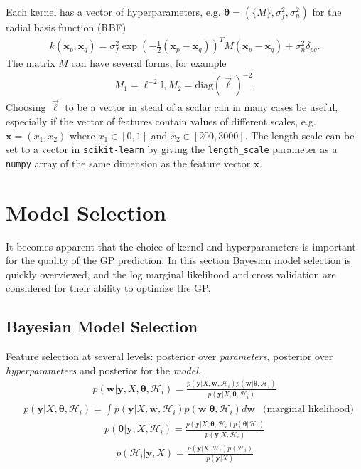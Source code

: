 \documentclass[twoside,english]{uiofysmaster}
\begin{document}
Each kernel has a vector of hyperparameters, e.g. $\boldsymbol{\theta} = (\{M\}, \sigma^2_f, \sigma_n^2)$ for the radial basis function (RBF)
\begin{align}
k(\textbf{x}_p, \textbf{x}_q) = \sigma_f^2 \exp (- \frac{1}{2} (\textbf{x}_p - \textbf{x}_q))^T M (\textbf{x}_p - \textbf{x}_q) + \sigma_n^2 \delta_{pq}.
\end{align}
The matrix $M$ can have several forms, for example
\begin{align}
M_1 = \ell^{-2} \mathbb{I} , M_2 = \text{diag}(\vec{\ell})^{-2}.
\end{align}
Choosing $\vec{\ell}$ to be a vector in stead of a scalar can in many cases be useful, especially if the vector of features contain values of different scales, e.g. $\textbf{x} = (x_1, x_2)$ where $x_1 \in [0, 1]$ and $x_2 \in [200, 3000]$. The length scale can be set to a vector in \verb|scikit-learn| by giving the \verb|length_scale| parameter as a \verb|numpy| array of the same dimension as the feature vector $\textbf{x}$.



\section{Model Selection}

It becomes apparent that the choice of kernel and hyperparameters is important for the quality of the GP prediction. In this section Bayesian model selection is quickly overviewed, and the log marginal likelihood and cross validation are considered for their ability to optimize the GP.

\subsection{Bayesian Model Selection}

Feature selection at several levels: posterior over \textit{parameters}, posterior over \textit{hyperparameters} and posterior for the \textit{model},
\begin{align}
p(\textbf{w}| \textbf{y}, X, \boldsymbol{\theta}, \mathcal{H}_i) = \frac{p(\textbf{y} | X, \textbf{w}, \mathcal{H}_i) p(\textbf{w}|\boldsymbol{\theta}, \mathcal{H}_i)}{p(\textbf{y}|X, \boldsymbol{\theta}, \mathcal{H}_i)}
\end{align}
\begin{align}
&p(\textbf{y}|X, \boldsymbol{\theta}, \mathcal{H}_i) = \int p(\textbf{y} | X, \textbf{w}, \mathcal{H}_i)p(\textbf{w}| \boldsymbol{\theta}, \mathcal{H}_i) d \textbf{w} & \text{(marginal likelihood)}
\end{align}
\begin{align}
p( \boldsymbol{\theta}| \textbf{y}, X, \mathcal{H}_i) = \frac{p(\textbf{y} | X, \boldsymbol{\theta}, \mathcal{H}_i) p(\boldsymbol{\theta}| \mathcal{H}_i)}{p(\textbf{y}|X,  \mathcal{H}_i)}
\end{align}
\begin{align}
p(\mathcal{H}_i| \textbf{y}, X) = \frac{p(\textbf{y} | X, \mathcal{H}_i) p( \mathcal{H}_i)}{p(\textbf{y}|X)}
\end{align}
\end{document}
